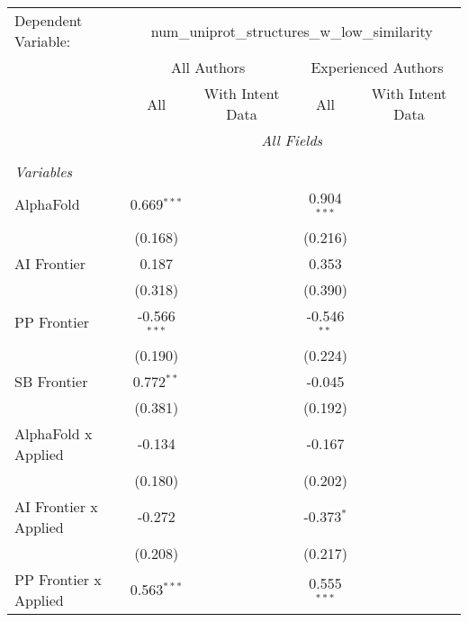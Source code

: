 \begingroup
\centering
\begin{tabular}{lcccccc}
   \tabularnewline \midrule \midrule
   Dependent Variable: & \multicolumn{6}{c}{num\_uniprot\_structures\_w\_low\_similarity}\\
 & \multicolumn{3}{c}{All Authors} & \multicolumn{3}{c}{Experienced Authors} \\
\cmidrule(lr){2-4} \cmidrule(lr){5-7}
 & \multicolumn{1}{c}{All} & \multicolumn{2}{c}{With Intent Data} & \multicolumn{1}{c}{All} & \multicolumn{2}{c}{With Intent Data} \\
\cmidrule(lr){2-2} \cmidrule(lr){3-4} \cmidrule(lr){5-5} \cmidrule(lr){6-7}
 & \multicolumn{6}{c}{\textit{All Fields}} \\ \\
   \emph{Variables}\\
   AlphaFold             & 0.669$^{***}$  &         &         & 0.904$^{***}$ &         &   \\   
                         & (0.168)        &         &         & (0.216)       &         &   \\   
   AI Frontier           & 0.187          &         &         & 0.353         &         &   \\   
                         & (0.318)        &         &         & (0.390)       &         &   \\   
   PP Frontier           & -0.566$^{***}$ &         &         & -0.546$^{**}$ &         &   \\   
                         & (0.190)        &         &         & (0.224)       &         &   \\   
   SB Frontier           & 0.772$^{**}$   &         &         & -0.045        &         &   \\   
                         & (0.381)        &         &         & (0.192)       &         &   \\   
   AlphaFold x Applied   & -0.134         &         &         & -0.167        &         &   \\   
                         & (0.180)        &         &         & (0.202)       &         &   \\   
   AI Frontier x Applied & -0.272         &         &         & -0.373$^{*}$  &         &   \\   
                         & (0.208)        &         &         & (0.217)       &         &   \\   
   PP Frontier x Applied & 0.563$^{***}$  &         &         & 0.555$^{***}$ &         &   \\   

\end{tabular}
